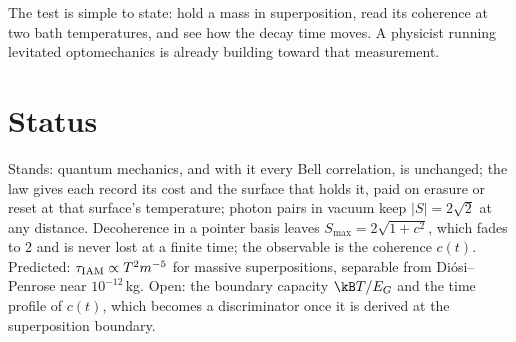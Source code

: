 The test is simple to state: hold a mass in superposition, read its coherence at two bath temperatures, and see how the decay time moves. A physicist running levitated optomechanics is already building toward that measurement.

\section{Status}
Stands: quantum mechanics, and with it every Bell correlation, is unchanged; the law gives each record its cost and the surface that holds it, paid
on erasure or reset at that surface's temperature; photon pairs in vacuum keep $|S|=2\sqrt2$ at any distance. \derived{} Decoherence in a pointer
basis leaves $S_{\max}=2\sqrt{1+c^2}$, which fades to 2 and is never lost at a finite time; the observable is the coherence $c(t)$. \derived{}
Predicted: $\tau_{\rm IAM}\propto T^2m^{-5}$ for massive superpositions, separable from Di\'osi--Penrose near $10^{-12}$\,kg. \prediction{} Open: the boundary capacity $\kB T/E_G$ and the time profile of $c(t)$, which becomes a discriminator once it is derived at the superposition boundary. \openprob
